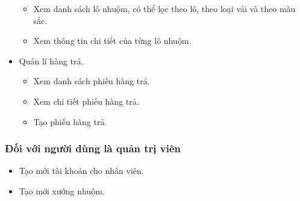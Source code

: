 \begin{itemize}
\begin{itemize}
        \item Xem danh sách lô nhuộm, có thể lọc theo lô, theo loại vải và theo màu sắc.
        \item Xem thông tin chi tiết của từng lô nhuộm.
    \end{itemize}
    \item Quản lí hàng trả.
    \begin{itemize}
        \item Xem danh sách phiếu hàng trả.
        \item Xem chi tiết phiếu hàng trả.
        \item Tạo phiếu hàng trả.
    \end{itemize}
\end{itemize}
\subsubsection{Đối với người dùng là quản trị viên}
\begin{itemize}
    \item Tạo mới tài khoản cho nhân viên.
    \item Tạo mới xưởng nhuộm.
\end{itemize}
